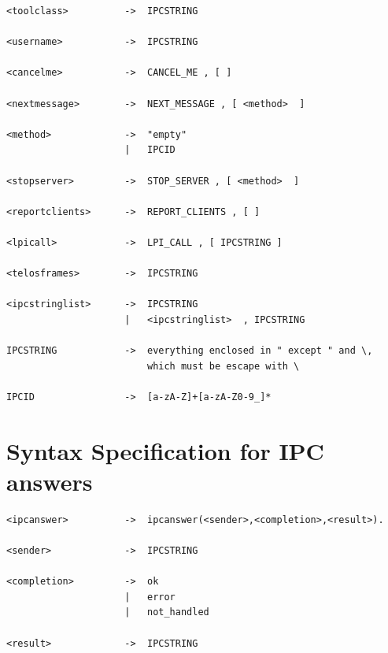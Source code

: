 \begin{verbatim}
<toolclass>          ->  IPCSTRING
 
<username>           ->  IPCSTRING
 
<cancelme>           ->  CANCEL_ME , [ ]
 
<nextmessage>        ->  NEXT_MESSAGE , [ <method>  ]
 
<method>             ->  "empty"
                     |   IPCID
 
<stopserver>         ->  STOP_SERVER , [ <method>  ]
 
<reportclients>      ->  REPORT_CLIENTS , [ ]
 
<lpicall>            ->  LPI_CALL , [ IPCSTRING ]
 
<telosframes>        ->  IPCSTRING
 
<ipcstringlist>      ->  IPCSTRING
                     |   <ipcstringlist>  , IPCSTRING
 
IPCSTRING            ->  everything enclosed in " except " and \, 
                         which must be escape with \
 
IPCID                ->  [a-zA-Z]+[a-zA-Z0-9_]*
\end{verbatim}


 
\section{Syntax Specification for IPC answers}
\label{sec:ipcanswers}
 
\begin{verbatim}
<ipcanswer>          ->  ipcanswer(<sender>,<completion>,<result>).

<sender>             ->  IPCSTRING

<completion>         ->  ok
                     |   error
                     |   not_handled
                     
<result>             ->  IPCSTRING
\end{verbatim}
